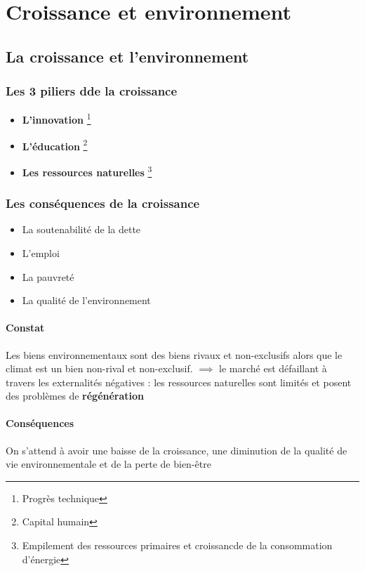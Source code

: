 \chapter{Croissance et environnement}
\section{La croissance et l'environnement}
\subsection{Les 3 piliers dde la croissance}
\begin{itemize}
    \item \textbf{L'innovation} \footnote{Progrès technique}
    \item \textbf{L'éducation} \footnote{Capital humain}
    \item \textbf{Les ressources naturelles} \footnote{Empilement des ressources primaires  et croissancde de la consommation d'énergie}
\end{itemize}
\subsection{Les conséquences de la croissance}
\begin{itemize}
    \item La soutenabilité de la dette
    \item L'emploi
    \item La pauvreté
    \item La qualité de l'environnement 
\end{itemize}
\newpage
\subsubsection{Constat}
Les biens environnementaux sont des biens rivaux et non-exclusifs alors que le climat est un bien non-rival et non-exclusif. \newline
$\implies$ le marché est défaillant à travers les externalités négatives : les ressources naturelles sont limités et posent des problèmes de \textbf{régénération}
\subsubsection{Conséquences}
On s'attend à avoir une baisse de la croissance, une diminution de la qualité de vie environnementale et de la perte de bien-être
